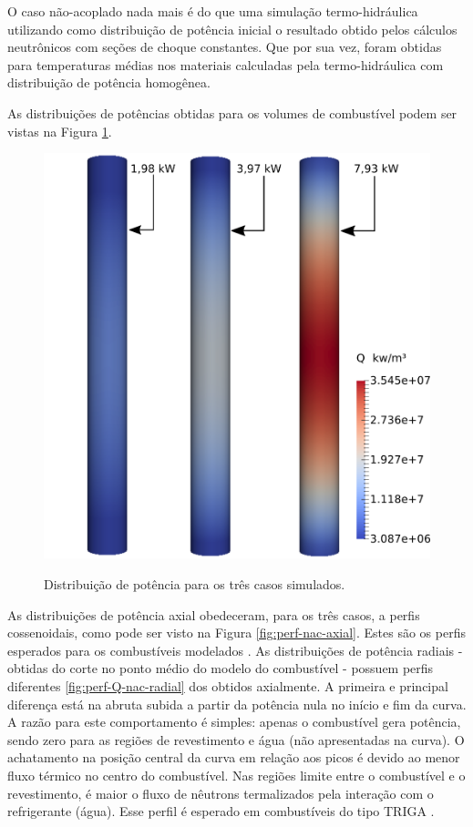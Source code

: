O caso não-acoplado nada mais é do que uma simulação termo-hidráulica utilizando como distribuição de potência
inicial o resultado obtido pelos cálculos neutrônicos com seções de choque constantes. Que por sua vez, foram
obtidas para temperaturas médias nos materiais calculadas pela termo-hidráulica com distribuição de potência
homogênea.

As distribuições de potências obtidas para os volumes de combustível podem ser vistas na Figura \ref{fig:pot-nc}.

\begin{figure}[htb]
  \caption[Distribuição de potência para os três casos simulados.]{Distribuição de potência para os três casos simulados.}
  \centering\includegraphics[scale=0.6]{figuras/Q_fuel_all_NC.png}
  \label{fig:pot-nc}
\end{figure}

As distribuições de potência axial obedeceram, para os três casos, a perfis
cossenoidais, como pode ser visto na Figura \ref{fig:perf-nac-axial}. Estes são os perfis esperados para
os combustíveis modelados \cite{Veloso2005}. As distribuições de potência radiais -
obtidas do corte no ponto médio do modelo do combustível - possuem perfis diferentes \ref{fig:perf-Q-nac-radial}
dos obtidos axialmente. A primeira e principal diferença está na abruta subida a partir da potência nula
no início e fim da curva. A razão para este comportamento é simples: apenas o combustível gera potência, sendo
zero para as regiões de revestimento e água (não apresentadas na curva). O achatamento na posição central
da curva em relação aos picos é devido ao menor fluxo térmico no centro do combustível. Nas regiões limite
entre o combustível e o revestimento, é maior o fluxo de nêutrons termalizados pela interação com o refrigerante (água).
Esse perfil é esperado em combustíveis do tipo TRIGA \cite{Ravnik1990}.

